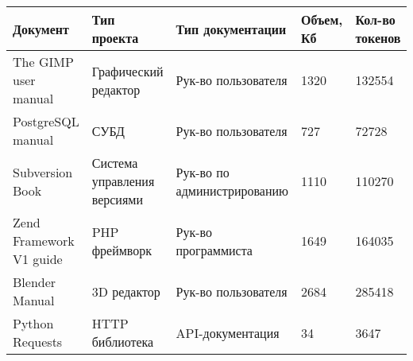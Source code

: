 \begin{minipage}{0.9\textwidth}
\begin{adjustbox}{center}
\begin{tabular}{|m{}||m{}|m{}|m{}|m{}|}
	\hline
	Документ & Тип проекта & Тип документации & Объем, Кб & Кол-во токенов \\
	\hline
	\hline
	The GIMP user manual  & Графический редактор  & Рук-во пользователя  & 1320  & 132554 \\
	\hline
	PostgreSQL manual & СУБД & Рук-во пользователя & 727 & 72728 \\
	\hline
	Subversion Book & Система управления версиями & Рук-во по администрированию & 1110 &  110270 \\
	\hline
	Zend Framework V1 guide & PHP фреймворк & Рук-во программиста & 1649 & 164035 \\
	\hline
	Blender Manual & 3D редактор & Рук-во пользователя & 2684 & 285418 \\
	\hline
	Python Requests & HTTP библиотека  & API-документация & 34 & 3647 \\
	\hline
\end{tabular}
\end{adjustbox}
\end{minipage}